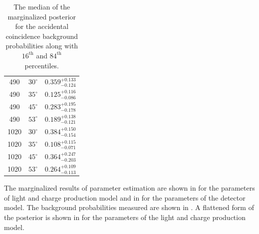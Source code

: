 \begin{table}[p]
\begin{tabular}{cc|c}
490 & $30^{\circ}$ & $0.359^{+0.133}_{-0.124}$ \\
490 & $35^{\circ}$ & $0.125^{+0.116}_{-0.086}$ \\
490 & $45^{\circ}$ & $0.283^{+0.195}_{-0.178}$ \\
490 & $53^{\circ}$ & $0.189^{+0.138}_{-0.121}$ \\

1020 & $30^{\circ}$ & $0.384^{+0.150}_{-0.154}$ \\
1020 & $35^{\circ}$ & $0.108^{+0.115}_{-0.071}$ \\
1020 & $45^{\circ}$ & $0.364^{+0.247}_{-0.203}$ \\
1020 & $53^{\circ}$ & $0.264^{+0.109}_{-0.113}$ \\

\end{tabular}
\caption{The median of the marginalized posterior for the accidental coincidence background probabilities along with $16^{\textrm{th}}$ and $84^{\textrm{th}}$ percentiles.}
\label{tab:nerix_bkg_prob}



\end{table}





The marginalized results of parameter estimation are shown in  for the parameters of light and charge production model and in  for the parameters of the detector model.  The background probabilities measured are shown in .  A flattened form of the posterior is shown in  for the parameters of the light and charge production model.  






